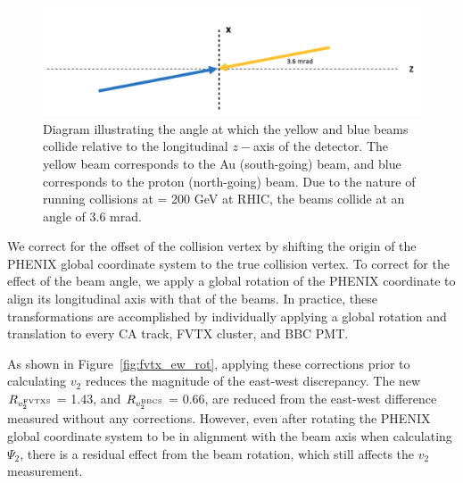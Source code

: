 \begin{figure}[!ht]
\centering
\includegraphics[width=0.75\linewidth]{figs/beam_angle.png}
\caption{Diagram illustrating the angle at which the yellow and blue beams collide relative to the longitudinal $z-$axis of the detector. The yellow beam corresponds to the Au (south-going) beam, and blue corresponds to the proton (north-going) beam. Due to the nature of running \pau collisions at \sqsn = 200 GeV at RHIC, the beams collide at an angle of 3.6 mrad.}
\label{fig:diagram2}
\end{figure}

We correct for the offset of the collision vertex by shifting the origin of the PHENIX global coordinate system to the true collision vertex. To correct for the effect of the beam angle, we apply a global rotation of the PHENIX coordinate to align its longitudinal axis with that of the beams. In practice, these transformations are accomplished by individually applying a global rotation and translation to every CA track, FVTX cluster, and BBC PMT. 

As shown in Figure~\ref{fig:fvtx_ew_rot}, applying these corrections prior to calculating $v_2$ reduces the magnitude of the east-west discrepancy. The new $R_{v_2^{\rm FVTXS}}$ = 1.43, and $R_{v_2^{\rm BBCS}}$ = 0.66, are reduced from the east-west difference measured without any corrections. However, even after rotating the PHENIX global coordinate system to be in alignment with the beam axis when calculating $\Psi_2$, there is a residual effect from the beam rotation, which still affects the $v_2$ measurement. 


